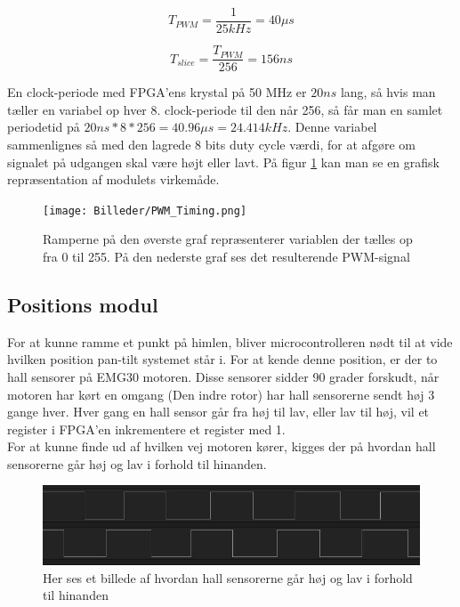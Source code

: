 \begin{equation}\label{eq:pwm_period}
T_{PWM}=\dfrac{1}{25 kHz} = 40 \mu s
\end{equation}

\begin{equation}\label{eq:pwm_slice}
T_{slice}=\dfrac{T_{PWM}}{256}=156ns
\end{equation}

En clock-periode med FPGA'ens krystal på 50 MHz er $20ns$ lang, så hvis man tæller en variabel op hver 8. clock-periode til den når 256, så får man en samlet periodetid på $20ns*8*256=40.96 \mu s=24.414kHz$. Denne variabel sammenlignes så med den lagrede 8 bits duty cycle værdi, for at afgøre om signalet på udgangen skal være højt eller lavt. På figur \ref{fig:PWM_timing} kan man se en grafisk repræsentation af modulets virkemåde.

\begin{figure}[ht]
	\begin{center}
		\texttt{[image: Billeder/PWM\_Timing.png]}
	\end{center}
\caption{Ramperne på den øverste graf repræsenterer variablen der tælles op fra 0 til 255. På den nederste graf ses det resulterende PWM-signal}
\label{fig:PWM_timing}
\end{figure}

\subsection{Positions modul}

For at kunne ramme et punkt på himlen, bliver microcontrolleren nødt til at vide hvilken position pan-tilt systemet står i.
For at kende denne position, er der to hall sensorer på EMG30 motoren.
Disse sensorer sidder 90 grader forskudt, når motoren har kørt en omgang (Den indre rotor) har hall sensorerne sendt høj 3 gange hver.
Hver gang en hall sensor går fra høj til lav, eller lav til høj, vil et register i FPGA'en inkrementere et register med 1.\\

For at kunne finde ud af hvilken vej motoren kører, kigges der på hvordan hall sensorerne går høj og lav i forhold til hinanden.

\begin{figure}[ht]
	\begin{center}
		\includegraphics[scale=0.5]{Billeder/Hall_sensorer.png}
	\end{center}
\label{fig:Hall_Sensorer}
\caption{Her ses et billede af hvordan hall sensorerne går høj og lav i forhold til hinanden}
\end{figure}

